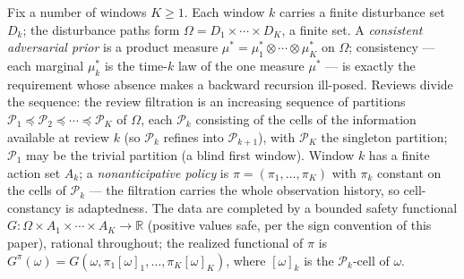 \documentclass[10pt,twocolumn]{article}
\theoremstyle{definition}
\begin{document}
Fix a number of windows $K \ge 1$. Each window $k$ carries a finite
disturbance set $D_{k}$; the disturbance paths form
$\Omega = D_{1} \times \cdots \times D_{K}$, a finite set. A
\emph{consistent adversarial prior} is a product measure
$\mu^{*} = \mu^{*}_{1} \otimes \cdots \otimes \mu^{*}_{K}$ on $\Omega$;
consistency --- each marginal $\mu^{*}_{k}$ is the time-$k$ law of the one measure $\mu^{*}$ --- is exactly the requirement whose absence makes a backward recursion ill-posed. Reviews divide the sequence: the review
filtration is an increasing sequence of partitions
$\mathcal{P}_{1} \preceq \mathcal{P}_{2} \preceq \cdots \preceq
\mathcal{P}_{K}$ of $\Omega$, each $\mathcal{P}_{k}$ consisting of the
cells of the information available at review $k$ (so
$\mathcal{P}_{k}$ refines into $\mathcal{P}_{k+1}$), with
$\mathcal{P}_{K}$ the singleton partition; $\mathcal{P}_{1}$ may be the
trivial partition (a blind first window). Window $k$ has a finite action
set $A_{k}$; a \emph{nonanticipative policy} is
$\pi = (\pi_{1}, \dots, \pi_{K})$ with $\pi_{k}$ constant on the cells
of $\mathcal{P}_{k}$ --- the filtration carries the whole observation
history, so cell-constancy is adaptedness. The data are completed by a
bounded safety functional $G: \Omega \times A_{1} \times \cdots \times
A_{K} \to \mathbb{R}$ (positive values safe, per the sign convention of
this paper), rational throughout; the realized functional of $\pi$ is
$G^{\pi}(\omega) = G(\omega, \pi_{1}[\omega]_{1}, \dots,
\pi_{K}[\omega]_{K})$, where $[\omega]_{k}$ is the
$\mathcal{P}_{k}$-cell of $\omega$.
\end{document}
